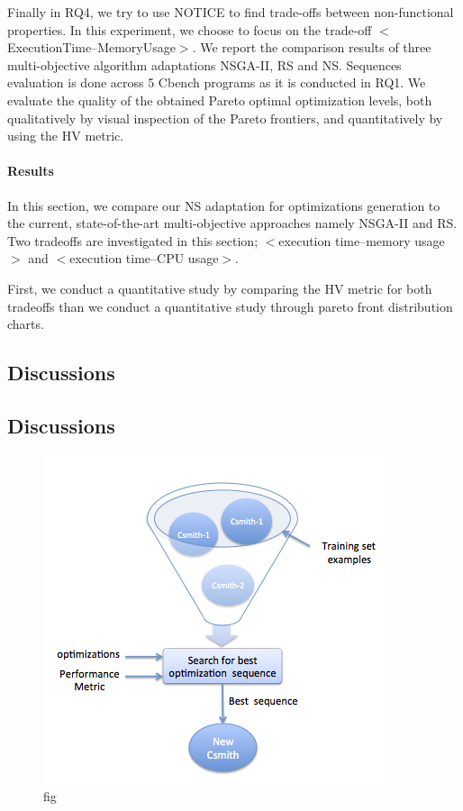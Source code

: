 Finally in RQ4, we try to use NOTICE to find trade-offs between non-functional properties. In this experiment, we choose to focus on the trade-off $<$ExecutionTime--MemoryUsage$>$. We report the comparison results of three multi-objective algorithm adaptations NSGA-II, RS and NS. 
Sequences evaluation is done across 5 Cbench programs as it is conducted in RQ1.
We evaluate the quality of the obtained Pareto optimal optimization levels, both qualitatively by visual inspection of the Pareto frontiers, and quantitatively by using the HV metric.
\paragraph{Results}
In this section, we compare our NS adaptation for optimizations generation to the current, state-of-the-art multi-objective approaches namely NSGA-II and RS. Two tradeoffs are investigated in this section; $<$execution time--memory usage$>$ and $<$execution time--CPU usage$>$.

First, we conduct a quantitative study by comparing the HV metric for both tradeoffs than we conduct a quantitative study through pareto front distribution charts.
\subsection{Discussions}
\subsection{Discussions}










\begin{figure}[!t]
	\centering
	\includegraphics[width=1\hsize]{Ressources/approach by example.png}
	\caption{fig}
\end{figure}

